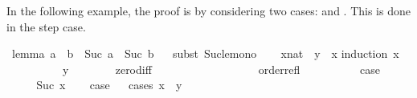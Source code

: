 \begin{isabellebody}
\begin{isamarkuptext}
      In the following example, the proof is by considering two cases:  and . This
      is done in the step case.%
\end{isamarkuptext}\isamarkuptrue%
\isamarkupfalse%
\ lemma{}{\isacharcolon}{\kern0pt}\ {\isachardoublequoteopen}a\ {\isasymle}\ b\ {\isasymLongrightarrow}\ Suc\ a\ {\isasymle}\ Suc\ b{\isachardoublequoteclose}\isanewline
%
\isadelimproof
\ \ %
\endisadelimproof
%
\isatagproof
{}\isamarkupfalse%
{\isacharparenleft}{\kern0pt}subst\ Suc{\isacharunderscore}{\kern0pt}le{\isacharunderscore}{\kern0pt}mono{\isacharparenright}{\kern0pt}\isanewline
\ \ \isacommand{{\isachardot}{\kern0pt}}\isamarkupfalse%
%
\endisatagproof
{\isafoldproof}%
%
\isadelimproof
\isanewline
%
\endisadelimproof
\isanewline
{}\isamarkupfalse%
\ {\isachardoublequoteopen}{\isacharparenleft}{\kern0pt}x{\isacharcolon}{\kern0pt}{\isacharcolon}{\kern0pt}nat{\isacharparenright}{\kern0pt}\ {\isacharminus}{\kern0pt}\ y\ {\isasymle}\ x{\isachardoublequoteclose}\isanewline
%
\isadelimproof
%
\endisadelimproof
%
\isatagproof
{}\isamarkupfalse%
{\isacharparenleft}{\kern0pt}induction\ x{\isacharparenright}{\kern0pt}\isanewline
\ \ \isamarkupfalse%
\ {}\isanewline
\ \ \isamarkupfalse%
\ {\isachardoublequoteopen}{}\ {\isacharminus}{\kern0pt}\ y\ {\isacharequal}{\kern0pt}\ {}{\isachardoublequoteclose}\isanewline
\ \ \ \ \isamarkupfalse%
\ zero{\isacharunderscore}{\kern0pt}diff\isanewline
\ \ \ \ \isacommand{{\isachardot}{\kern0pt}}\isamarkupfalse%
\isanewline
\ \ \isamarkupfalse%
\ \isamarkupfalse%
\ {\isachardoublequoteopen}{\isachardot}{\kern0pt}{\isachardot}{\kern0pt}{\isachardot}{\kern0pt}\ {\isasymle}\ {}{\isachardoublequoteclose}\isanewline
\ \ \ \ \isamarkupfalse%
\ order{\isachardot}{\kern0pt}refl\isanewline
\ \ \ \ \isacommand{{\isachardot}{\kern0pt}}\isamarkupfalse%
\isanewline
\ \ \isamarkupfalse%
\ \isamarkupfalse%
\ {\isacharquery}{\kern0pt}case\isanewline
\ \ \ \ \isacommand{{\isachardot}{\kern0pt}}\isamarkupfalse%
\ \isanewline
{}\isamarkupfalse%
\isanewline
\ \ \isamarkupfalse%
\ {\isacharparenleft}{\kern0pt}Suc\ x{\isacharparenright}{\kern0pt}\isanewline
\ \ \isamarkupfalse%
\ {\isacharquery}{\kern0pt}case\isanewline
\ \ \isamarkupfalse%
{\isacharparenleft}{\kern0pt}cases\ {\isachardoublequoteopen}x\ {\isasymge}\ y{\isachardoublequoteclose}{\isacharparenright}{\kern0pt}\isanewline

\end{isabellebody}
